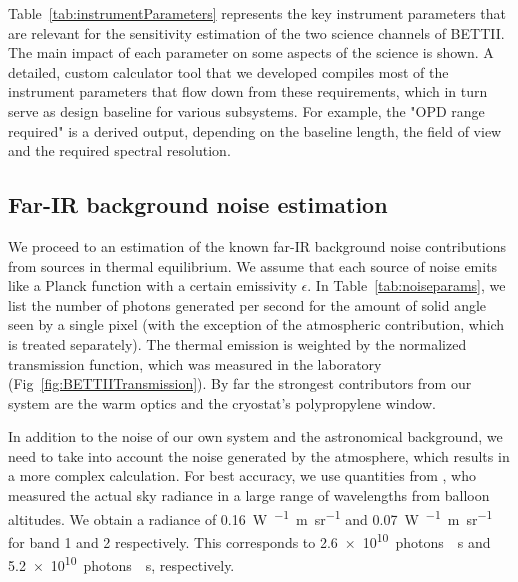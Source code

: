 Table~\ref{tab:instrumentParameters} represents the key instrument parameters that are relevant for the sensitivity estimation of the two science channels of BETTII. The main impact of each parameter on some aspects of the science is shown. A detailed, custom calculator tool that we developed compiles most of the instrument parameters that flow down from these requirements, which in turn serve as design baseline for various subsystems. For example, the "OPD range required" is a derived output, depending on the baseline length, the field of view and the required spectral resolution.


\subsection{Far-IR background noise estimation}



We proceed to an estimation of the known far-IR background noise contributions from sources in thermal equilibrium. We assume that each source of noise emits like a Planck function \Bnu with a certain emissivity $\epsilon$. In Table~\ref{tab:noiseparams}, we list the number of photons generated per second for the amount of solid angle seen by a single pixel (with the exception of the atmospheric contribution, which is treated separately). The thermal emission is weighted by the normalized transmission function, which was measured in the laboratory (Fig~\ref{fig:BETTIITransmission}). By far the strongest contributors from our system are the warm optics and the cryostat's polypropylene window.
 

In addition to the noise of our own system and the astronomical background, we need to take into account the noise generated by the atmosphere, which results in a more complex calculation. For best accuracy, we use quantities from \cite{Harries:1980cva}, who measured the actual sky radiance in a large range of wavelengths from balloon altitudes. We obtain a radiance of \SI{0.16}{\watt\per{}\meter\per\steradian} and \SI{0.07}{\watt\per{}\meter\per\steradian} for band 1 and 2 respectively. This corresponds to \num{2.6e10}~photons~\si{\per\second} and \num{5.2e10}~photons~\si{\per\second}, respectively. 

